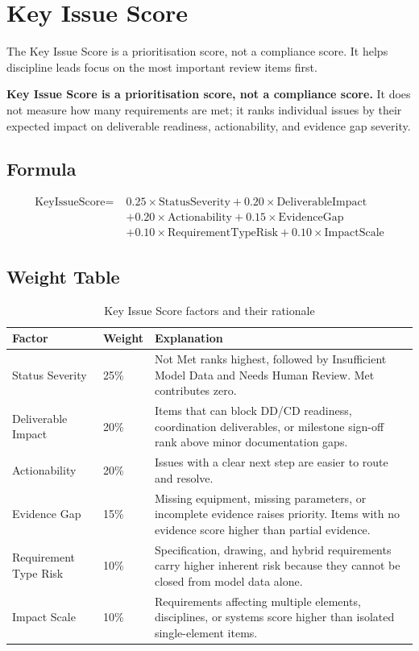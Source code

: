 \documentclass[10pt,letterpaper]{article}
\newcommand{\strong}[1]{\textbf{\textcolor{emaNavy}{#1}}}
\newcommand{\guardrailbox}[1]{%
\begin{tcolorbox}[colback=guardrailBlue,colframe=guardrailBorder,
    boxrule=0.6pt,arc=2mm,left=10pt,right=10pt,top=8pt,bottom=8pt]\small #1%
\end{tcolorbox}}
\begin{document}
\section{Key Issue Score}

The Key Issue Score is a prioritisation score, not a compliance score. It helps discipline leads
focus on the most important review items first.

\guardrailbox{\strong{Key Issue Score is a prioritisation score, not a compliance score.} It does
  not measure how many requirements are met; it ranks individual issues by their expected impact on
  deliverable readiness, actionability, and evidence gap severity.}

\subsection{Formula}

\[
\begin{aligned}
\text{KeyIssueScore} =\;& 0.25 \times \text{StatusSeverity}
+ 0.20 \times \text{DeliverableImpact} \\
&+ 0.20 \times \text{Actionability}
+ 0.15 \times \text{EvidenceGap} \\
&+ 0.10 \times \text{RequirementTypeRisk}
+ 0.10 \times \text{ImpactScale}
\end{aligned}
\]

\subsection{Weight Table}

\begin{longtable}{p{1.5in}p{0.7in}p{3.8in}}
\caption{Key Issue Score factors and their rationale\label{tab:key-issue-weights}}\\
\toprule
\textbf{Factor} & \textbf{Weight} & \textbf{Explanation} \\
\midrule
\endhead
Status Severity & 25\% & Not Met ranks highest, followed by Insufficient Model Data and Needs
  Human Review. Met contributes zero. \\
Deliverable Impact & 20\% & Items that can block DD/CD readiness, coordination deliverables, or
  milestone sign-off rank above minor documentation gaps. \\
Actionability & 20\% & Issues with a clear next step are easier to route and resolve. \\
Evidence Gap & 15\% & Missing equipment, missing parameters, or incomplete evidence raises
  priority. Items with no evidence score higher than partial evidence. \\
Requirement Type Risk & 10\% & Specification, drawing, and hybrid requirements carry higher
  inherent risk because they cannot be closed from model data alone. \\
Impact Scale & 10\% & Requirements affecting multiple elements, disciplines, or systems score
  higher than isolated single-element items. \\
\bottomrule
\end{longtable}
\end{document}
